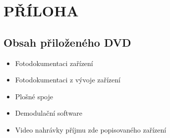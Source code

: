 \clearpage
\appendix
\section{PŘÍLOHA}
	\subsection{Obsah přiloženého DVD}
	
	\begin{itemize}
		\item Fotodokumentaci zařízení
		\item Fotodokumentaci z vývoje zařízení
		\item Plošné spoje
		\item Demodulační software
		\item Video nahrávky příjmu zde popisovaného zařízení
	\end{itemize}
	
